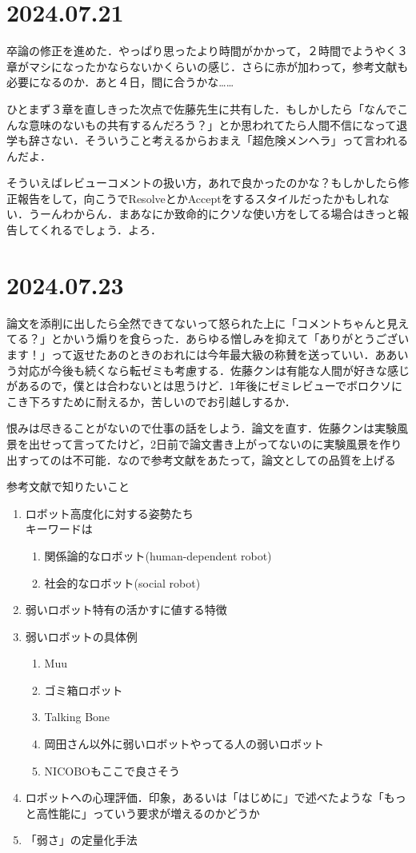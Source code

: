 \documentclass[twocolumn]{mynote}
\begin{document}
\section*{2024.07.21}
卒論の修正を進めた．やっぱり思ったより時間がかかって，２時間でようやく３章がマシになったかならないかくらいの感じ．さらに赤が加わって，参考文献も必要になるのか．あと４日，間に合うかな……

ひとまず３章を直しきった次点で佐藤先生に共有した．もしかしたら「なんでこんな意味のないもの共有するんだろう？」とか思われてたら人間不信になって退学も辞さない．そういうこと考えるからおまえ「超危険メンヘラ」って言われるんだよ．

そういえばレビューコメントの扱い方，あれで良かったのかな？もしかしたら修正報告をして，向こうでResolveとかAcceptをするスタイルだったかもしれない．うーんわからん．まあなにか致命的にクソな使い方をしてる場合はきっと報告してくれるでしょう．よろ．

\section*{2024.07.23}
論文を添削に出したら全然できてないって怒られた上に「コメントちゃんと見えてる？」とかいう煽りを食らった．あらゆる憎しみを抑えて「ありがとうございます！」って返せたあのときのおれには今年最大級の称賛を送っていい．ああいう対応が今後も続くなら転ゼミも考慮する．佐藤クンは有能な人間が好きな感じがあるので，僕とは合わないとは思うけど．1年後にゼミレビューでボロクソにこき下ろすために耐えるか，苦しいのでお引越しするか．

恨みは尽きることがないので仕事の話をしよう．論文を直す．佐藤クンは実験風景を出せって言ってたけど，2日前で論文書き上がってないのに実験風景を作り出すってのは不可能．なので参考文献をあたって，論文としての品質を上げる

参考文献で知りたいこと

\begin{enumerate}
  \item ロボット高度化に対する姿勢たち \\ キーワードは
    \begin{enumerate}
      \item 関係論的なロボット(human-dependent robot)
      \item 社会的なロボット(social robot)
    \end{enumerate}
  \item 弱いロボット特有の活かすに値する特徴
  \item 弱いロボットの具体例
    \begin{enumerate}
      \item Muu
      \item ゴミ箱ロボット
      \item Talking Bone
      \item 岡田さん以外に弱いロボットやってる人の弱いロボット
      \item NICOBOもここで良さそう
    \end{enumerate}
  \item ロボットへの心理評価．印象，あるいは「はじめに」で述べたような「もっと高性能に」っていう要求が増えるのかどうか
  \item 「弱さ」の定量化手法
\end{enumerate}
\end{document}
